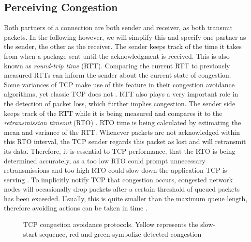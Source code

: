 \documentclass[a4paper,conference]{IEEEtran}
\begin{document}
\subsection{Perceiving Congestion}
\label{sec:P_C_marker}
Both partners of a connection are both sender and receiver, as both transmit packets. In the following however, we will simplify this and specify one partner as the sender, the other as the receiver. The sender keeps track of the time it takes from when a package sent until the acknowledgment is received. This is also known as \textit{round-trip time} (RTT). Comparing the current RTT to previously measured RTTs can inform the sender about the current state of congestion. Some variances of TCP make use of this feature in their congestion avoidance algorithms, yet classic TCP does not \cite{huston2000tcp,jacobson1995congestion}. RTT also plays a very important role in the detection of packet loss, which further implies congestion. The sender side keeps track of the RTT while it is being measured and compares it to the \textit{retransmission timeout} (RTO) \cite{jacobson1992tcp}. RTO time is being calculated by estimating the mean and variance of the RTT. Whenever packets are not acknowledged within this RTO interval, the TCP sender regards this packet as lost and will retransmit its data. Therefore, it is essential to TCP performance, that the RTO is being determined accurately, as a too low RTO could prompt unnecessary retransmissions and too high RTO could slow down the application TCP is serving \cite{huston2000tcp,jacobson1995congestion}. To implicitly notify TCP that congestion occurs, congested network nodes will occasionally drop packets after a certain threshold of queued packets has been exceeded. Usually, this is quite smaller than the maximum queue length, therefore avoiding actions can be taken in time \cite{ramakrishnan1999proposal}.

\begin{figure}
  \centering
  \caption{TCP congestion avoidance protocols. Yellow represents the slow-start sequence, red and green symbolize detected congestion}
  \label{fig:tcp_congestion_avoidance_protocols}
\end{figure}
\end{document}
